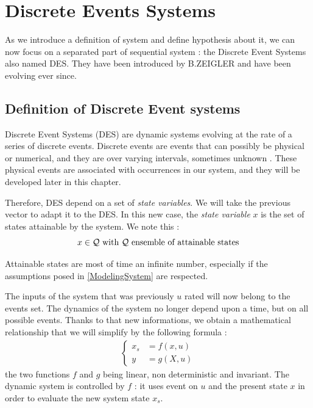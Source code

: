 \chapter{Discrete Events Systems}

As we introduce a definition of system and define hypothesis about it, we can now focus on a separated part of sequential system : the Discrete Event Systems also named DES. They have been introduced by B.ZEIGLER and have been evolving ever since.


\section{Definition of Discrete Event systems}

Discrete Event Systems (DES) are dynamic systems evolving at the rate of a series of discrete events. Discrete events are events that can possibly be physical or numerical, and they are over varying intervals, sometimes unknown \cite{controlOfDiscreteEvent_Ramadge}. These physical events are associated with occurrences in our system, and they will be developed later in this chapter.

Therefore, DES depend on a set of \emph{state variables}. We will take the previous vector to adapt it to the DES. In this new case, the \emph{state variable} $x$ is the set of states attainable by the system. We note this :
\begin{equation*}
x \in \cal{Q} \text{ with $\cal{Q}$  ensemble of attainable states}
\end{equation*}

Attainable states are most of time an infinite number, especially if the assumptions posed in \ref{ModelingSystem} are respected.

The inputs of the system that was previously $u$ rated will now belong to the events set. The dynamics of the system no longer depend upon a time, but on all possible events. Thanks to that new informations, we obtain a mathematical relationship that we will simplify by the following formula :
\begin{eqnarray}\label{stateSpaceDES}
\left\lbrace
\begin{aligned}
x_s &= f(x, u)\\
y  &= g(X, u) 
\end{aligned}
\right.
\end{eqnarray}
the two functions $f$ and $g$ being linear, non deterministic and invariant. The dynamic system is controlled by $f$ : it uses event on $u$ and the present state $x$ in order to evaluate the new system state $x_s$.

